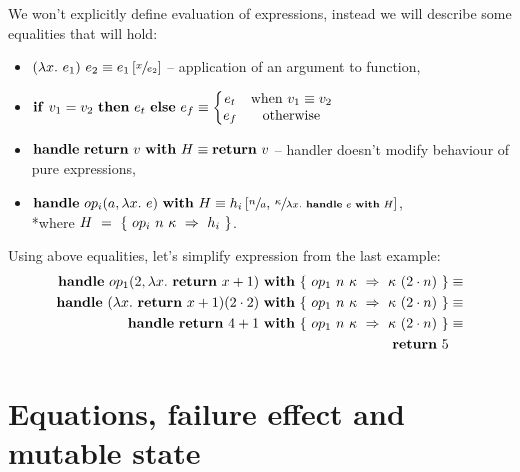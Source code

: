 We won't explicitly define evaluation of expressions, instead we will describe some equalities that will hold:
\begin{itemize}
\item \((\lambda x.\ e_1)\ e_2 \equiv e_1 \left[\sfrac{x}{e_2}\right]\) -- application of an argument to function,
\item
  \(\begin{aligned}[t]
    \mathbf{if}\ v_1 = v_2\ \mathbf{then}\ e_t\ \mathbf{else}\ e_f \equiv \left\{\begin{matrix}
    e_t & \text{when }v_1 \equiv v_2 \\
    e_f & \text{otherwise}
    \end{matrix}\right.
  \end{aligned}\)
\item \(\mathbf{handle}\ \mathbf{return}\ v\ \mathbf{with}\ H \equiv \mathbf{return}\ v\) -- handler doesn't modify behaviour of pure expressions,
\item \(\mathbf{handle}\ op_{i}(a, \lambda x.\ e)\ \mathbf{with}\ H \equiv h_i \left[\sfrac{n}{a},\, \sfrac{\kappa}{\lambda x.\ \mathbf{handle}\ e\ \mathbf{with}\ H}\right] \), \\*where \(H~=~\{\ op_i\ n\ \kappa\ \Rightarrow\ h_i \ \}\).
  
\end{itemize}

Using above equalities, let's simplify expression from the last example:
\begin{equation}\begin{split}
  \handle{\opi{1}{2}{\fun{x}{\return{x + 1}}}}{\{\ \hcase{op_1}{n\ \kappa}{\kappa\ (2 \cdot n)} \ \}} &\equiv \\
  \handle{(\fun{x}{\return{x+1}}) (2 \cdot 2)}{\{\ \hcase{op_1}{n\ \kappa}{\kappa\ (2 \cdot n)} \ \}} &\equiv \\
  \handle{\return{4+1}}{\{\ \hcase{op_1}{n\ \kappa}{\kappa\ (2 \cdot n)} \ \}} &\equiv \\
  \return{5} %
\end{split}\end{equation}


\section{Equations, failure effect and mutable state}

